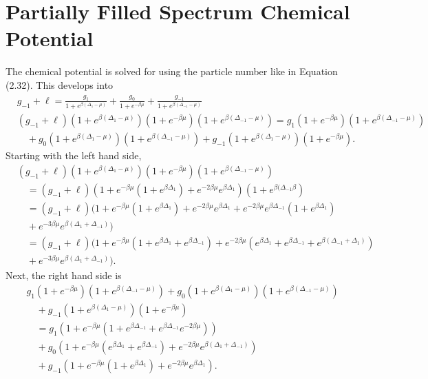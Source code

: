 \section{Partially Filled Spectrum Chemical Potential}
The chemical potential is solved for using the particle number like in Equation (2.32). This develops into  
\begin{align}
    &g_{-1}+\ell=\frac{g_1}{1+e^{\beta(\Delta_1-\mu)}}+\frac{g_0}{1+e^{-\beta\mu}}+\frac{g_{-1}}{1+e^{\beta(\Delta_{-1}-\mu)}}\\
    &(g_{-1}+\ell)(1+e^{\beta(\Delta_1-\mu)})(1+e^{-\beta\mu})(1+e^{\beta(\Delta_{-1}-\mu)})=g_1(1+e^{-\beta\mu})(1+e^{\beta(\Delta_{-1}-\mu)})\nonumber\\
    &\quad+g_0(1+e^{\beta(\Delta_1-\mu)})(1+e^{\beta(\Delta_{-1}-\mu)})+g_{-1}(1+e^{\beta(\Delta_1-\mu)})(1+e^{-\beta\mu}).
    \end{align}
Starting with the left hand side,
\begin{align}
    &(g_{-1}+\ell)(1+e^{\beta(\Delta_1-\mu)})(1+e^{-\beta\mu})(1+e^{\beta(\Delta_{-1}-\mu)})\nonumber\\
    &\quad=(g_{-1}+\ell)(1+e^{-\beta\mu}(1+e^{\beta\Delta_1})+e^{-2\beta\mu}e^{\beta\Delta_1})(1+e^{\beta(\Delta_{-1}\beta})\nonumber\\
    &\quad=(g_{-1}+\ell)(1+e^{-\beta\mu}(1+e^{\beta\Delta_1})+e^{-2\beta\mu}e^{\beta\Delta_1}+e^{-2\beta\mu}e^{\beta\Delta_{-1}}(1+e^{\beta\Delta_1})\nonumber\\
    &\quad+e^{-3\beta\mu}e^{\beta(\Delta_1+\Delta_{-1})})\nonumber\\
    &\quad=(g_{-1}+\ell)(1+e^{-\beta\mu}(1+e^{\beta\Delta_1}+e^{\beta\Delta_{-1}})+e^{-2\beta\mu}(e^{\beta\Delta_1}+e^{\beta\Delta_{-1}}+e^{\beta(\Delta_{-1}+\Delta_1)})\nonumber\\
    &\quad+e^{-3\beta\mu}e^{\beta(\Delta_1+\Delta_{-1})}).
\end{align}
Next, the right hand side is
\begin{align}
    &g_1(1+e^{-\beta\mu})(1+e^{\beta(\Delta_{-1}-\mu)})+g_0(1+e^{\beta(\Delta_1-\mu)})(1+e^{\beta(\Delta_{-1}-\mu)})\nonumber\\
    &\quad+g_{-1}(1+e^{\beta(\Delta_1-\mu)})(1+e^{-\beta\mu})\\
    &\quad=g_1(1+e^{-\beta\mu}(1+e^{\beta\Delta_{-1}}+e^{\beta\Delta_{-1}}e^{-2\beta\mu}))\nonumber\\
    &\quad+g_0(1+e^{-\beta\mu}(e^{\beta\Delta_1}+e^{\beta\Delta_{-1}})+e^{-2\beta\mu}e^{\beta(\Delta_1+\Delta_{-1})})\nonumber\\
    &\quad+g_{-1}(1+e^{-\beta\mu}(1+e^{\beta\Delta_1})+e^{-2\beta\mu}e^{\beta\Delta_1}).
\end{align}
